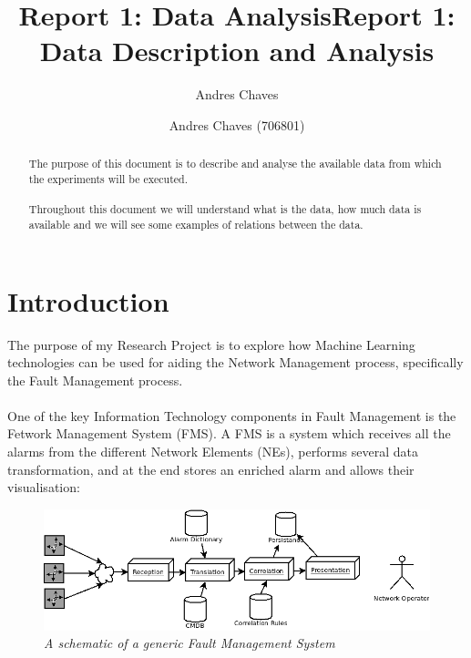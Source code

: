 \documentclass[10pt,a4paper]{report}
\author{Andres Chaves}
\title{Report 1: Data Analysis}
\begin{document}
 \title{Report 1: Data Description and Analysis}
 \author{Andres Chaves (706801) \\
  }
 \maketitle

\begin{abstract}
    The purpose of this document is to describe and analyse the available data from which the experiments will be executed.
   \\\\
   Throughout this document we will understand what is the data, how much data is available and we will see some examples of relations between the data.
\end{abstract}

 \chapter*{Introduction}
The purpose of my Research Project is to explore how Machine Learning technologies can be used for aiding the Network Management process, specifically the Fault Management process.
\\\\
One of the key Information Technology components in Fault Management is the Fetwork Management System (FMS). A FMS is a system which receives all the alarms from the different Network Elements (NEs), performs several data transformation, and at the end stores an enriched alarm and allows their visualisation:

\begin{figure}[H]
 \includegraphics[scale=0.4]{../research_proposal/NMS_GeneralDiagram.png}
  \centering
  \caption{\textit{A schematic of a generic Fault Management System}}
  \label{fig:nms_generaldiagram}
\end{figure}	
\end{document}
